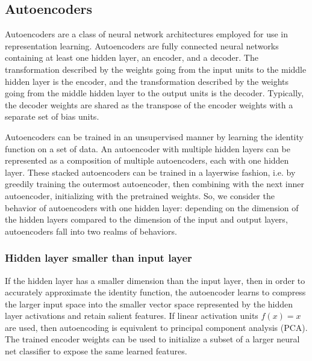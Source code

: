 \documentclass{article} %
\begin{document}
\subsection{Autoencoders}
Autoencoders are a class of neural network architectures employed for use in representation learning. Autoencoders are fully connected neural networks containing at least one hidden layer, an encoder, and a decoder. The transformation described by the weights going from the input units to the middle hidden layer is the encoder, and the transformation described by the weights going from the middle hidden layer to the output units is the decoder. Typically, the decoder weights are shared as the transpose of the encoder weights with a separate set of bias units.

Autoencoders can be trained in an unsupervised manner by learning the identity function on a set of data. An autoencoder with multiple hidden layers can be represented as a composition of multiple autoencoders, each with one hidden layer. These stacked autoencoders can be trained in a layerwise fashion, i.e. by greedily training the outermost autoencoder, then combining with the next inner autoencoder, initializing with the pretrained weights. So, we consider the behavior of autoencoders with one hidden layer: depending on the dimension of the hidden layers compared to the dimension of the input and output layers, autoencoders fall into two realms of behaviors.

\subsubsection{Hidden layer smaller than input layer}
If the hidden layer has a smaller dimension than the input layer, then in order to accurately approximate the identity function, the autoencoder learns to compress the larger input space into the smaller vector space represented by the hidden layer activations and retain salient features. If linear activation units $f(x) = x$ are used, then autoencoding is equivalent to principal component analysis (PCA). The trained encoder weights can be used to initialize a subset of a larger neural net classifier to expose the same learned features.
\end{document}
